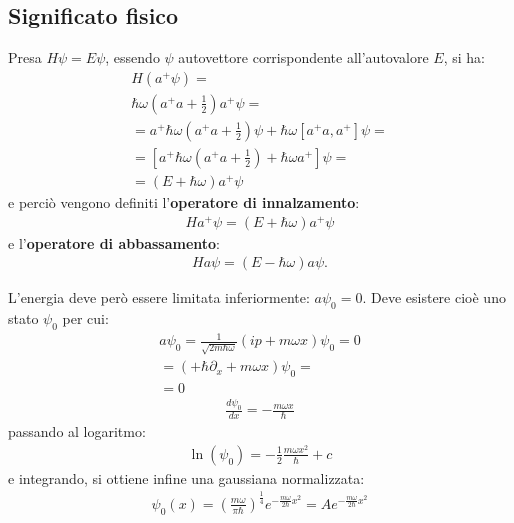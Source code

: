 \subsection{Significato fisico} %
Presa $H\psi =E\psi $, essendo $\psi$ autovettore corrispondente all'autovalore $E$, si ha:
\begin{equation}\begin{split}
H\left(a^+\psi \right)=\\
\hbar \omega \left(a^+a+\frac{1}{2}\right)a^+\psi =\\
=a^+\hbar \omega \left(a^+a+\frac{1}{2}\right)\psi +\hbar \omega \left[a^+a,a^+\right]\psi =\\
=\left[a^+\hbar \omega \left(a^+a+\frac{1}{2}\right)+\hbar \omega a^+\right]\psi =\\
=\left(E+\hbar \omega \right)a^+\psi 
\end{split}\end{equation}
e perciò vengono definiti l'\textbf{operatore di innalzamento}:
\begin{equation}\begin{split}
Ha^+\psi =\left(E+\hbar \omega \right)a^+\psi 
\end{split}\end{equation}
e l'\textbf{operatore di abbassamento}:
\begin{equation}\begin{split}
Ha\psi =\left(E-\hbar \omega \right)a\psi .
\end{split}\end{equation}

L'energia deve però essere limitata inferiormente: $a\psi _0=0$. Deve esistere cioè uno stato $\psi _0$ per cui:
\begin{equation}\begin{split}
a\psi_0=\frac{1}{\sqrt{2m\hbar \omega }}\left(ip+m\omega x\right)\psi _0=0\\
=\left(+\hbar \partial _x+m\omega x\right)\psi _0=\\
=0
\end{split}\end{equation}
\begin{equation}\begin{split}
\frac{d\psi _0}{dx}=-\frac{m\omega x}{\hbar }
\end{split}\end{equation}
passando al logaritmo:
\begin{equation}\begin{split}
\ln{\left(\psi _0\right)}=-\frac{1}{2}\frac{m\omega x^2}{\hbar }+c
\end{split}\end{equation}
e integrando, si ottiene infine una gaussiana normalizzata:
\begin{equation}\begin{split}
\psi _0\left(x\right)=\left(\frac{m\omega }{\pi \hbar }\right)^{\frac{1}{4}}e^{-\frac{m\omega }{2\hbar }x^2}=Ae^{-\frac{m\omega }{2\hbar }x^2}
\end{split}\end{equation}

